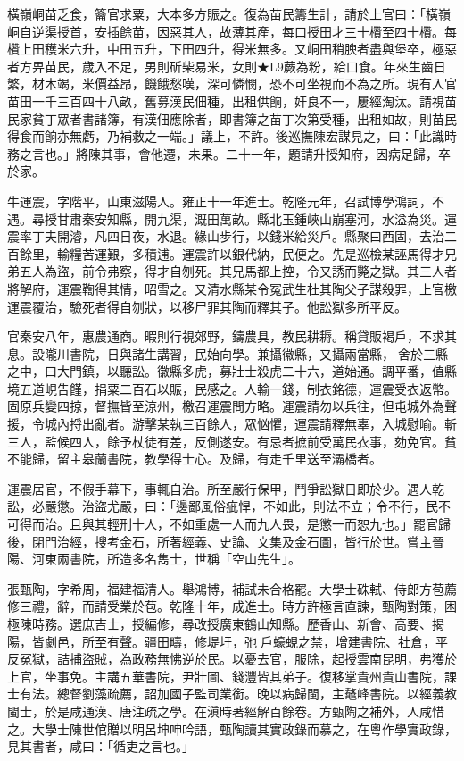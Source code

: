 \begin{pinyinscope}
橫嶺峒苗乏食，籥官求粟，大本多方賑之。復為苗民籌生計，請於上官曰：「橫嶺峒自逆渠授首，安插餘苗，因惡其人，故薄其產，每口授田才三十欑至四十欑。每欑上田穫米六升，中田五升，下田四升，得米無多。又峒田稍腴者盡與堡卒，極惡者方畀苗民，歲入不足，男則斫柴易米，女則★L9蕨為粉，給口食。年來生齒日繁，材木竭，米價益昂，饑餓愁嘆，深可憐憫，恐不可坐視而不為之所。現有入官苗田一千三百四十八畝，舊募漢民佃種，出租供餉，奸良不一，屢經淘汰。請視苗民家貧丁眾者書諸簿，有漢佃應除者，即書簿之苗丁次第受種，出租如故，則苗民得食而餉亦無虧，乃補救之一端。」議上，不許。後巡撫陳宏謀見之，曰：「此識時務之言也。」將陳其事，會他遷，未果。二十一年，題請升授知府，因病足歸，卒於家。

牛運震，字階平，山東滋陽人。雍正十一年進士。乾隆元年，召試博學鴻詞，不遇。尋授甘肅秦安知縣，開九渠，溉田萬畝。縣北玉鍾峽山崩塞河，水溢為災。運震率丁夫開濬，凡四日夜，水退。緣山步行，以錢米給災戶。縣聚曰西固，去治二百餘里，輸糧苦運艱，多積逋。運震許以銀代納，民便之。先是巡檢某誣馬得才兄弟五人為盜，前令弗察，得才自刎死。其兄馬都上控，令又誘而斃之獄。其三人者將解府，運震鞫得其情，昭雪之。又清水縣某令冤武生杜其陶父子謀殺罪，上官檄運震覆治，驗死者得自刎狀，以移尸罪其陶而釋其子。他訟獄多所平反。

官秦安八年，惠農通商。暇則行視郊野，鑄農具，教民耕耨。稱貸販褐戶，不求其息。設隴川書院，日與諸生講習，民始向學。兼攝徽縣，又攝兩當縣，舍於三縣之中，曰大門鎮，以聽訟。徽縣多虎，募壯士殺虎二十六，道始通。調平番，值縣境五道峴告饉，捐粟二百石以賑，民感之。人輸一錢，制衣銘德，運震受衣返幣。固原兵變四掠，督撫皆至涼州，檄召運震問方略。運震請勿以兵往，但屯城外為聲援，令城內捋出亂者。游擊某執三百餘人，眾忷懼，運震請釋無辜，入城慰喻。斬三人，監候四人，餘予杖徒有差，反側遂安。有忌者摭前受萬民衣事，劾免官。貧不能歸，留主皋蘭書院，教學得士心。及歸，有走千里送至灞橋者。

運震居官，不假手幕下，事輒自治。所至嚴行保甲，鬥爭訟獄日即於少。遇人乾訟，必嚴懲。治盜尤嚴，曰：「邊鄙風俗疵悍，不如此，則法不立；令不行，民不可得而治。且與其輕刑十人，不如重處一人而九人畏，是懲一而恕九也。」罷官歸後，閉門治經，搜考金石，所著經義、史論、文集及金石圖，皆行於世。嘗主晉陽、河東兩書院，所造多名雋士，世稱「空山先生」。

張甄陶，字希周，福建福清人。舉鴻博，補試未合格罷。大學士硃軾、侍郎方苞薦修三禮，辭，而請受業於苞。乾隆十年，成進士。時方許極言直諫，甄陶對策，困極陳時務。選庶吉士，授編修，尋改授廣東鶴山知縣。歷香山、新會、高要、揭陽，皆劇邑，所至有聲。疆田疇，修堤圩，弛戶蠔蜆之禁，增建書院、社倉，平反冤獄，詰捕盜賊，為政務無怫逆於民。以憂去官，服除，起授雲南昆明，弗獲於上官，坐事免。主講五華書院，尹壯圖、錢灃皆其弟子。復移掌貴州貴山書院，課士有法。總督劉藻疏薦，詔加國子監司業銜。晚以病歸閩，主鼇峰書院。以經義教閩士，於是咸通漢、唐注疏之學。在滇時著經解百餘卷。方甄陶之補外，人咸惜之。大學士陳世倌贈以明呂坤呻吟語，甄陶讀其實政錄而慕之，在粵作學實政錄，見其書者，咸曰：「循吏之言也。」


\end{pinyinscope}
